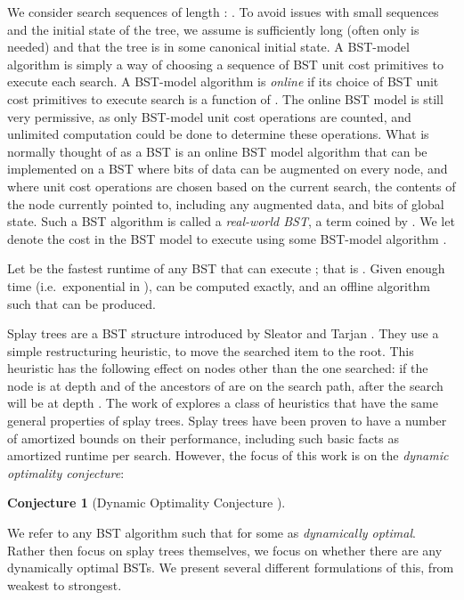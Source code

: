 \documentclass[11pt]{article}
\newtheorem{conjecture}[theorem]{Conjecture}
\begin{document}
We consider search sequences  of length : . To avoid issues with small sequences and the initial state of the tree, we assume  is sufficiently long (often only  is needed) and that the tree is in some canonical initial state. 
A BST-model algorithm is simply a way of choosing a sequence of BST unit cost primitives to execute each search. A BST-model algorithm is \emph{online} if its choice of BST unit cost primitives to execute search  is a function of . The online BST model is still very permissive, as only BST-model unit cost operations are counted, and unlimited computation could be done to determine these operations. What is normally thought of as a BST is an online BST model algorithm that can be implemented on a BST where  bits of data can be augmented on every node, and where unit cost operations are chosen based on the current search, the contents of the node currently pointed to, including any augmented data, and  bits of global state. Such a BST algorithm is called a \emph{real-world BST}, a term coined by \cite{DBLP:conf/icalp/BoseCFL12}.
We let  denote the cost in the BST model to execute  using some BST-model algorithm .

Let  be the fastest runtime of any BST that can execute ; that is . Given enough time (i.e.~exponential in ),  can be computed exactly, and an offline algorithm  such that  can be produced.

Splay trees are a BST structure introduced by Sleator and Tarjan \cite{DBLP:journals/jacm/SleatorT85}. They use a simple restructuring heuristic, to move the searched item to the root. This heuristic has the following effect on nodes other than the one searched: if the node  is at depth  and  of the ancestors of  are on the search path, after the search  will be at depth . The work of \cite{DBLP:journals/jal/Subramanian96} explores a class of heuristics that have the same general properties of splay trees. Splay trees have been proven to have a number of amortized bounds on their performance, including such basic facts as  amortized runtime per search. However, the focus of this work is on the \emph{dynamic optimality conjecture}:


\begin{conjecture}[Dynamic Optimality Conjecture \cite{DBLP:journals/jacm/SleatorT85}]

\end{conjecture}

We refer to any BST algorithm  such that  for some  as \emph{dynamically optimal}.
Rather then focus on splay trees themselves, we focus on whether there are any dynamically optimal BSTs. We present several different formulations of this, from weakest to strongest.
\end{document}
